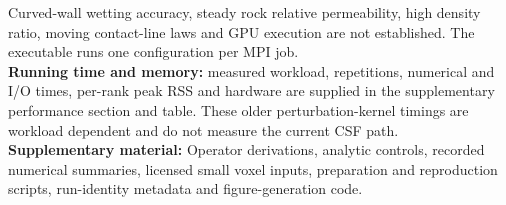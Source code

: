 Curved-wall wetting accuracy, steady rock relative permeability, high density
ratio, moving contact-line laws and GPU execution are not established.
The executable runs one configuration per MPI job.\\
\textbf{Running time and memory:} measured workload, repetitions, numerical
and I/O times, per-rank peak RSS and hardware are supplied in the supplementary
performance section and table. These older perturbation-kernel timings
are workload dependent and do not measure the current CSF path.\\
\textbf{Supplementary material:} Operator derivations, analytic controls,
recorded numerical summaries, licensed small voxel inputs, preparation and
reproduction scripts, run-identity metadata and figure-generation code.
